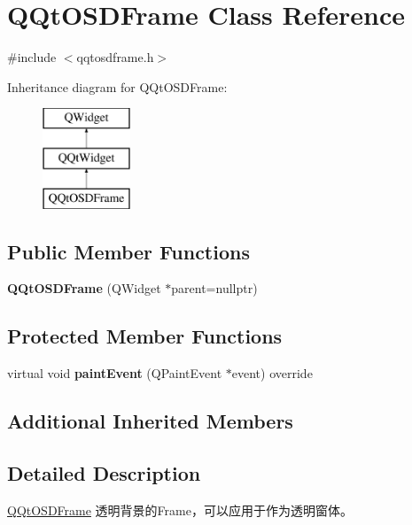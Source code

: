 \hypertarget{class_q_qt_o_s_d_frame}{}\section{Q\+Qt\+O\+S\+D\+Frame Class Reference}
\label{class_q_qt_o_s_d_frame}


{\ttfamily \#include $<$qqtosdframe.\+h$>$}

Inheritance diagram for Q\+Qt\+O\+S\+D\+Frame\+:\begin{figure}[H]
\begin{center}
\leavevmode
\includegraphics[height=3.000000cm]{class_q_qt_o_s_d_frame}
\end{center}
\end{figure}
\subsection*{Public Member Functions}
\begin{DoxyCompactItemize}
\item 
\mbox{\label{class_q_qt_o_s_d_frame_a3a20ea9eb1953e44c01aae5e4fa54802}} 
{\bfseries Q\+Qt\+O\+S\+D\+Frame} (Q\+Widget $\ast$parent=nullptr)
\end{DoxyCompactItemize}
\subsection*{Protected Member Functions}
\begin{DoxyCompactItemize}
\item 
\mbox{\label{class_q_qt_o_s_d_frame_a465351c586f40a0b82d0f46317e66044}} 
virtual void {\bfseries paint\+Event} (Q\+Paint\+Event $\ast$event) override
\end{DoxyCompactItemize}
\subsection*{Additional Inherited Members}


\subsection{Detailed Description}
\mbox{\hyperlink{class_q_qt_o_s_d_frame}{Q\+Qt\+O\+S\+D\+Frame}} 透明背景的\+Frame，可以应用于作为透明窗体。

